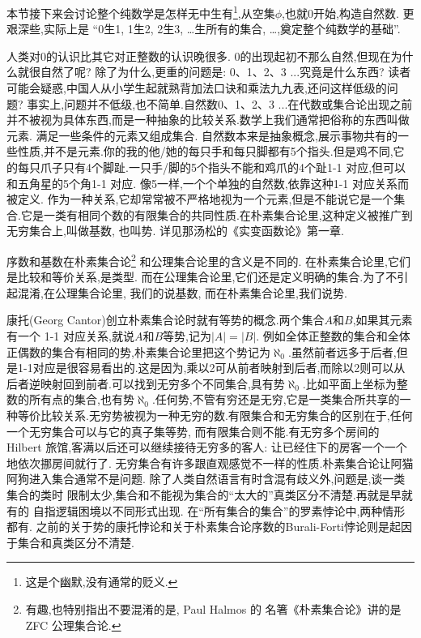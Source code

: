  {\small
 本节接下来会讨论整个纯数学是怎样无中生有\footnote{这是个幽默,没有通常的贬义.},从空集$\phi$,也就0开始,构造自然数.
更艰深些,实际上是 “0生1, 1生2, 2生3, \dots 生所有的集合, \dots,奠定整个纯数学的基础”.

人类对0的认识比其它对正整数的认识晚很多. 0的出现起初不那么自然,但现在为什么就很自然了呢?
除了为什么,更重的问题是: 0、1、2、3 ...究竟是什么东西?
读者可能会疑惑,中国人从小学生起就熟背加法口诀和乘法九九表,还问这样低级的问题?
事实上,问题并不低级,也不简单.自然数0、1、2、3 ...在代数或集合论出现之前并不被视为具体东西,而是一种抽象的比较关系.数学上我们通常把俗称的东西叫做元素.
满足一些条件的元素又组成集合.
自然数本来是抽象概念,展示事物共有的一些性质,并不是元素.你的我的他/她的每只手和每只脚都有5个指头.但是鸡不同,它的每只爪子只有4个脚趾.一只手/脚的5个指头不能和鸡爪的4个趾1-1 对应,但可以和五角星的5个角1-1 对应.
像5一样,一个个单独的自然数,依靠这种1-1 对应关系而被定义.
作为一种关系,它却常常被不严格地视为一个元素,但是不能说它是一个集合.它是一类有相同个数的有限集合的共同性质.在朴素集合论里,这种定义被推广到无穷集合上,叫做基数, 也叫势.
详见那汤松的《实变函数论》\cite{Natanco}第一章.

序数和基数在朴素集合论\footnote{有趣,也特别指出不要混淆的是, Paul Halmos 的
名箸《朴素集合论》\cite{HalmosP}讲的是ZFC 公理集合论.}
和公理集合论里的含义是不同的. 
在朴素集合论里,它们是比较和等价关系,是类型.
而在公理集合论里,它们还是定义明确的集合.为了不引起混淆,在公理集合论里,
我们的说基数,
而在朴素集合论里,我们说势.

康托(Georg Cantor)创立朴素集合论时就有等势的概念.两个集合$A$和$B$,如果其元素有一个 1-1 对应关系,就说$A$和$B$等势,记为$|A|=|B|$.
例如全体正整数的集合和全体正偶数的集合有相同的势,朴素集合论里把这个势记为$\aleph_0$.虽然前者远多于后者,但是1-1对应是很容易看出的.这是因为,乘以2可从前者映射到后者,而除以2则可以从后者逆映射回到前者.可以找到无穷多个不同集合,具有势$\aleph_0$.比如平面上坐标为整数的所有点的集合,也有势$\aleph_0$.任何势,不管有穷还是无穷,它是一类集合所共享的一种等价比较关系.无穷势被视为一种无穷的数.有限集合和无穷集合的区别在于,任何一个无穷集合可以与它的真子集等势, 而有限集合则不能.有无穷多个房间的Hilbert 旅馆,客满以后还可以继续接待无穷多的客人: 让已经住下的房客一个一个地依次挪房间就行了.
无穷集合有许多跟直观感觉不一样的性质.朴素集合论让阿猫阿狗进入集合通常不是问题.
除了人类自然语言有时含混有歧义外,问题是,谈一类集合的类时
限制太少,集合和不能视为集合的“太大的”真类区分不清楚.再就是早就有的
自指逻辑困境以不同形式出现.
在“所有集合的集合”的罗素悖论中,两种情形都有.
之前的关于势的康托悖论和关于朴素集合论序数的Burali-Forti悖论则是起因于集合和真类区分不清楚.

}
